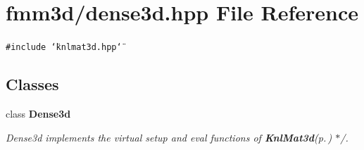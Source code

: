 \section{fmm3d/dense3d.hpp File Reference}
\label{dense3d_8hpp}


{\tt \#include \char`\"{}knlmat3d.hpp\char`\"{}}\par
\subsection*{Classes}
\begin{CompactItemize}
\item 
class {\bf Dense3d}
\begin{CompactList}\small\item\em Dense3d implements the virtual setup and eval functions of {\bf Knl\-Mat3d}{\rm (p.\,\pageref{classKnlMat3d})} $\ast$/. \item\end{CompactList}\end{CompactItemize}
